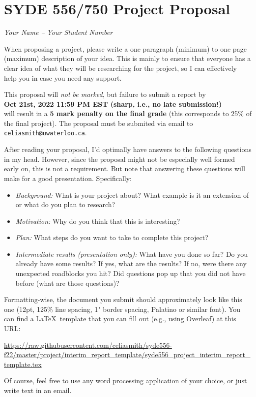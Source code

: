 \documentclass[12pt,letterpaper,oneside]{article}
\begin{document}
	\section*{SYDE 556/750 Project Proposal}

	\emph{Your Name -- Your Student Number}

	When proposing a project, please write a one paragraph (minimum) to one page (maximum) description of your idea. This is mainly to ensure that everyone has a clear idea of what they will be researching for the project, so I can effectively help you in case you need any support.

  This proposal will \emph{not be marked}, but failure to submit a report by\\[0.25cm]
	{\centering\bf Oct 21st, 2022 11:59 PM EST (sharp, i.e., no late submission!)\\[0.25cm]}
	will result in a \textbf{5 mark penalty on the final grade} (this corresponds to 25\% of the final project). The proposal must be submited via email to \texttt{celiasmith@uwaterloo.ca}.

	After reading your proposal, I'd optimally have answers to the following questions in my head. However, since the proposal might not be especially well formed early on, this is not a requirement. But note that answering these questions will make for a good presentation.  Specifically:
	\begin{itemize}
		\item \emph{Background:} What is your project about? What example is it an extension of or what do you plan to research?
		\item \emph{Motivation:} Why do you think that this is interesting?
		\item \emph{Plan:} What steps do you want to take to complete this project?
		\item \emph{Intermediate results (presentation only):} What have you done so far? Do you already have some results? If yes, what are the results? If no, were there any unexpected roadblocks you hit? Did questions pop up that you did not have before (what are those questions)?
	\end{itemize}

	Formatting-wise, the document you submit should approximately look like this one (12pt, 125\% line spacing, 1" border spacing, Palatino or similar font). You can find a \LaTeX\ template that you can fill out (e.g., using Overleaf) at this URL:
	\begin{center}
		\small
		\url{https://raw.githubusercontent.com/celiasmith/syde556-f22/master/project/interim_report_template/syde556_project_interim_report_template.tex}
	\end{center}

	Of course, feel free to use any word processing application of your choice, or just write text in an email.
\end{document}
